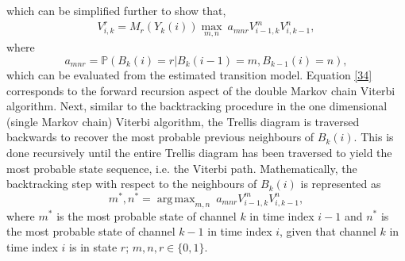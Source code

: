 \documentclass[10pt,twocolumn]{IEEEtran}
\DeclareMathOperator*{\argmax}{arg\,max}
\begin{document}
which can be simplified further to show that,
\begin{equation}\label{34}
    \begin{aligned}
        V_{i,k}^{r} = M_r(Y_k(i))\max_{m,n}\ a_{mnr}V_{i-1,k}^{m}V_{i,k-1}^{n},
    \end{aligned}
\end{equation}
where
\begin{equation}\label{35}
    a_{mnr} = \mathbb{P}(B_k(i)=r|B_{k}(i-1)=m,B_{k-1}(i)=n),
\end{equation}
which can be evaluated from the estimated transition model. Equation \eqref{34} corresponds to the forward recursion aspect of the double Markov chain Viterbi algorithm. Next, similar to the backtracking procedure in the one dimensional (single Markov chain) Viterbi algorithm, the Trellis diagram is traversed backwards to recover the most probable previous neighbours of $B_k(i)$. This is done recursively until the entire Trellis diagram has been traversed to yield the most probable state sequence, i.e. the Viterbi path. Mathematically, the backtracking step with respect to the neighbours of $B_k(i)$ is represented as
\begin{equation}\label{36}
    m^*, n^* = \argmax_{m,n}\ a_{mnr}V_{i-1,k}^{m}V_{i,k-1}^{n},
\end{equation}
where $m^*$ is the most probable state of channel $k$ in time index $i-1$ and $n^*$ is the most probable state of channel $k-1$ in time index $i$, given that channel $k$ in time index $i$ is in state $r$; $m, n, r \in \{0,1\}$.
\end{document}
